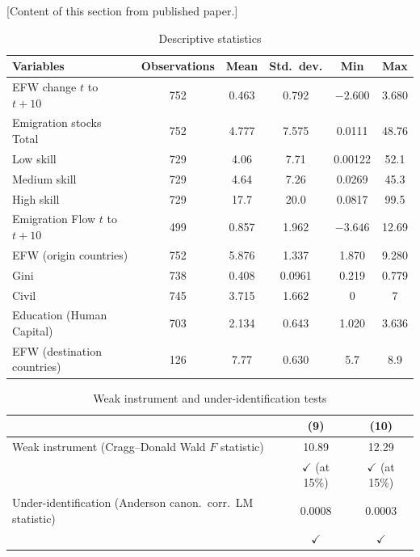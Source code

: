 \documentclass[12pt]{article}
\begin{document}
[Content of this section from published paper.]

\begin{table}[H]
\centering
\caption{Descriptive statistics}
\label{tab:descriptive}
\begin{threeparttable}
\begin{tabular}{@{}lccccc@{}}
\toprule
Variables & Observations & Mean & Std.\ dev. & Min & Max \\
\midrule
EFW change $t$ to $t+10$ & 752 & 0.463 & 0.792 & $-2.600$ & 3.680 \\
Emigration stocks Total & 752 & 4.777 & 7.575 & 0.0111 & 48.76 \\
\quad Low skill & 729 & 4.06 & 7.71 & 0.00122 & 52.1 \\
\quad Medium skill & 729 & 4.64 & 7.26 & 0.0269 & 45.3 \\
\quad High skill & 729 & 17.7 & 20.0 & 0.0817 & 99.5 \\
Emigration Flow $t$ to $t+10$ & 499 & 0.857 & 1.962 & $-3.646$ & 12.69 \\
EFW (origin countries) & 752 & 5.876 & 1.337 & 1.870 & 9.280 \\
Gini & 738 & 0.408 & 0.0961 & 0.219 & 0.779 \\
Civil & 745 & 3.715 & 1.662 & 0 & 7 \\
Education (Human Capital) & 703 & 2.134 & 0.643 & 1.020 & 3.636 \\
EFW (destination countries) & 126 & 7.77 & 0.630 & 5.7 & 8.9 \\
\bottomrule
\end{tabular}
\end{threeparttable}
\end{table}

\begin{table}[H]
\centering
\caption{Weak instrument and under-identification tests}
\label{tab:instrument_tests}
\begin{threeparttable}
\begin{tabular}{@{}lcc@{}}
\toprule
 & (9) & (10) \\
\midrule
Weak instrument (Cragg--Donald Wald $F$ statistic) & 10.89 & 12.29 \\
 & $\checkmark$ (at 15\%) & $\checkmark$ (at 15\%) \\[4pt]
Under-identification (Anderson canon.\ corr.\ LM statistic) & 0.0008 & 0.0003 \\
 & $\checkmark$ & $\checkmark$ \\
\bottomrule
\end{tabular}
\end{threeparttable}
\end{table}
\end{document}

